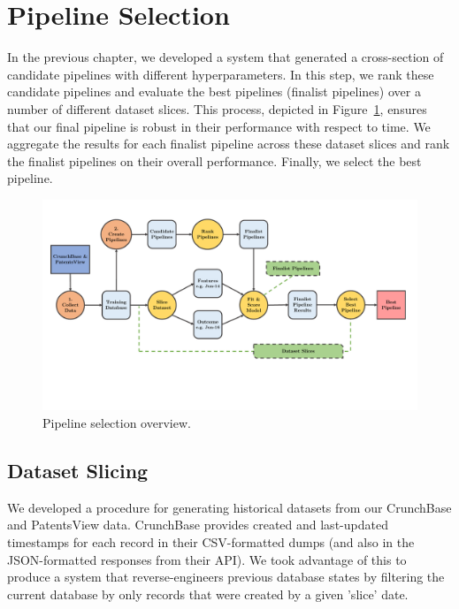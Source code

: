 \documentclass[../thesis/thesis.tex]{subfiles}
\begin{document}
\section{Pipeline Selection}

In the previous chapter, we developed a system that generated a cross-section of candidate pipelines with different hyperparameters. In this step, we rank these candidate pipelines and evaluate the best pipelines (finalist pipelines) over a number of different dataset slices. This process, depicted in Figure~\ref{fig:design:pipeline_selection}, ensures that our final pipeline is robust in their performance with respect to time. We aggregate the results for each finalist pipeline across these dataset slices and rank the finalist pipelines on their overall performance. Finally, we select the best pipeline.

\begin{figure}[!htb]
    \centering
    \includegraphics[width=\textwidth]{../figures/design/flowchart_pipeline_selection}
    \caption[Pipeline selection flowchart]{Pipeline selection overview.}
    \label{fig:design:pipeline_selection}
\end{figure}

\subsection{Dataset Slicing}

We developed a procedure for generating historical datasets from our CrunchBase and PatentsView data. CrunchBase provides created and last-updated timestamps for each record in their CSV-formatted dumps (and also in the JSON-formatted responses from their API). We took advantage of this to produce a system that reverse-engineers previous database states by filtering the current database by only records that were created by a given 'slice' date.
\end{document}
